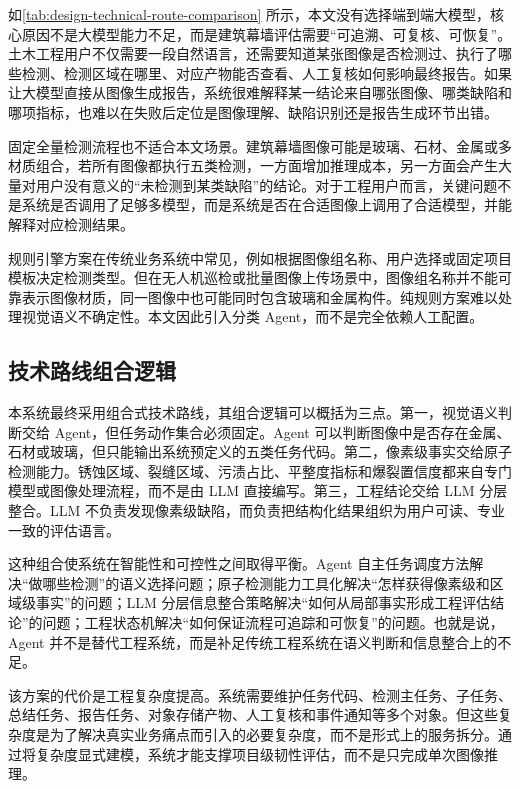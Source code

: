 如\cref{tab:design-technical-route-comparison} 所示，本文没有选择端到端大模型，核心原因不是大模型能力不足，而是建筑幕墙评估需要“可追溯、可复核、可恢复”。土木工程用户不仅需要一段自然语言，还需要知道某张图像是否检测过、执行了哪些检测、检测区域在哪里、对应产物能否查看、人工复核如何影响最终报告。如果让大模型直接从图像生成报告，系统很难解释某一结论来自哪张图像、哪类缺陷和哪项指标，也难以在失败后定位是图像理解、缺陷识别还是报告生成环节出错。

固定全量检测流程也不适合本文场景。建筑幕墙图像可能是玻璃、石材、金属或多材质组合，若所有图像都执行五类检测，一方面增加推理成本，另一方面会产生大量对用户没有意义的“未检测到某类缺陷”的结论。对于工程用户而言，关键问题不是系统是否调用了足够多模型，而是系统是否在合适图像上调用了合适模型，并能解释对应检测结果。

规则引擎方案在传统业务系统中常见，例如根据图像组名称、用户选择或固定项目模板决定检测类型。但在无人机巡检或批量图像上传场景中，图像组名称并不能可靠表示图像材质，同一图像中也可能同时包含玻璃和金属构件。纯规则方案难以处理视觉语义不确定性。本文因此引入分类 Agent，而不是完全依赖人工配置。

\subsection{技术路线组合逻辑}
\label{subsec:design-technical-route-composition}

本系统最终采用组合式技术路线，其组合逻辑可以概括为三点。第一，视觉语义判断交给 Agent，但任务动作集合必须固定。Agent 可以判断图像中是否存在金属、石材或玻璃，但只能输出系统预定义的五类任务代码。第二，像素级事实交给原子检测能力。锈蚀区域、裂缝区域、污渍占比、平整度指标和爆裂置信度都来自专门模型或图像处理流程，而不是由 LLM 直接编写。第三，工程结论交给 LLM 分层整合。LLM 不负责发现像素级缺陷，而负责把结构化结果组织为用户可读、专业一致的评估语言。

这种组合使系统在智能性和可控性之间取得平衡。Agent 自主任务调度方法解决“做哪些检测”的语义选择问题；原子检测能力工具化解决“怎样获得像素级和区域级事实”的问题；LLM 分层信息整合策略解决“如何从局部事实形成工程评估结论”的问题；工程状态机解决“如何保证流程可追踪和可恢复”的问题。也就是说，Agent 并不是替代工程系统，而是补足传统工程系统在语义判断和信息整合上的不足。

该方案的代价是工程复杂度提高。系统需要维护任务代码、检测主任务、子任务、总结任务、报告任务、对象存储产物、人工复核和事件通知等多个对象。但这些复杂度是为了解决真实业务痛点而引入的必要复杂度，而不是形式上的服务拆分。通过将复杂度显式建模，系统才能支撑项目级韧性评估，而不是只完成单次图像推理。

